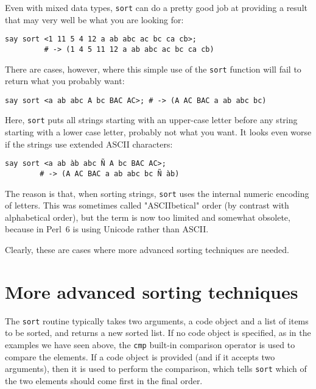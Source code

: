 Even with mixed data types, {\tt sort} can do a pretty good 
job at providing a result that may very well be what 
you are looking for:

\begin{verbatim}
say sort <1 11 5 4 12 a ab abc ac bc ca cb>;
         # -> (1 4 5 11 12 a ab abc ac bc ca cb)
\end{verbatim}

There are cases, however, where this simple use of the 
{\tt sort} function will fail to return what you 
probably want:

\begin{verbatim}
say sort <a ab abc A bc BAC AC>; # -> (A AC BAC a ab abc bc)
\end{verbatim}
%

Here, {\tt sort} puts all strings starting with an 
upper-case letter before any string starting with a 
lower case letter, probably not what you want. It 
looks even worse if the strings use extended 
ASCII characters:

\begin{verbatim}
say sort <a ab àb abc Ñ A bc BAC AC>;
        # -> (A AC BAC a ab abc bc Ñ àb)
\end{verbatim}
%

The reason is that, when sorting strings, {\tt sort} 
uses the internal numeric encoding of letters. This 
was sometimes called "ASCIIbetical" order (by contrast 
with alphabetical order), but the term is now too limited 
and somewhat obsolete, because in Perl~6 is using Unicode 
rather than ASCII. 

Clearly, these are cases where more advanced sorting 
techniques are needed. 

\section{More advanced sorting techniques}
\label{advanced_sort}

The {\tt sort} routine typically takes two arguments, 
a code object and a list of items to be sorted, and returns 
a new sorted list. If no code object is specified, as in the 
examples we have seen above, the {\tt cmp} built-in comparison 
operator is used to compare the elements. If 
a code object is provided (and if it accepts two 
arguments), then it is used to perform the comparison, 
which tells {\tt sort} which of the two elements should 
come first in the final order.

